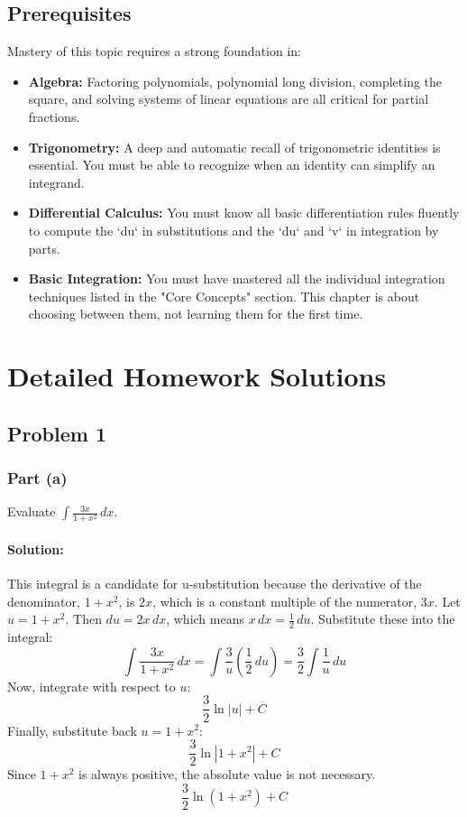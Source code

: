 \documentclass{article}
\begin{document}
\subsection{Prerequisites}
Mastery of this topic requires a strong foundation in:
\begin{itemize}
    \item \textbf{Algebra:} Factoring polynomials, polynomial long division, completing the square, and solving systems of linear equations are all critical for partial fractions.
    \item \textbf{Trigonometry:} A deep and automatic recall of trigonometric identities is essential. You must be able to recognize when an identity can simplify an integrand.
    \item \textbf{Differential Calculus:} You must know all basic differentiation rules fluently to compute the `du` in substitutions and the `du` and `v` in integration by parts.
    \item \textbf{Basic Integration:} You must have mastered all the individual integration techniques listed in the "Core Concepts" section. This chapter is about choosing between them, not learning them for the first time.
\end{itemize}

\section{Detailed Homework Solutions}

\subsection{Problem 1}
\subsubsection*{Part (a)}
Evaluate $\int \frac{3x}{1 + x^2} \, dx$.
\paragraph{Solution:} This integral is a candidate for u-substitution because the derivative of the denominator, $1+x^2$, is $2x$, which is a constant multiple of the numerator, $3x$.
Let $u = 1 + x^2$. Then $du = 2x \, dx$, which means $x \, dx = \frac{1}{2} \, du$.
Substitute these into the integral:
\[ \int \frac{3x}{1 + x^2} \, dx = \int \frac{3}{u} \left( \frac{1}{2} \, du \right) = \frac{3}{2} \int \frac{1}{u} \, du \]
Now, integrate with respect to $u$:
\[ \frac{3}{2} \ln|u| + C \]
Finally, substitute back $u = 1 + x^2$:
\[ \frac{3}{2} \ln|1 + x^2| + C \]
Since $1+x^2$ is always positive, the absolute value is not necessary.
\[ \boxed{\frac{3}{2} \ln(1 + x^2) + C} \]
\end{document}

